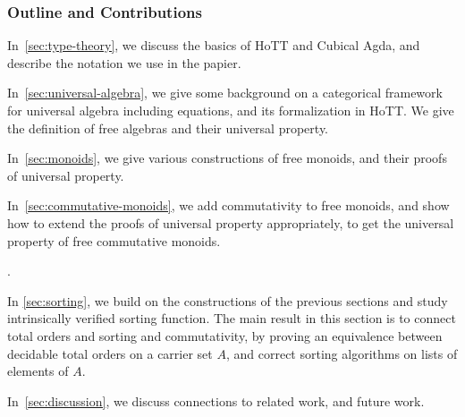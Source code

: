 


\subsubsection*{Outline and Contributions}

\begin{myitemize}
    \item In~\cref{sec:type-theory}, we discuss the basics of HoTT and Cubical Agda, and describe the notation we use in the papier.
    \item In~\cref{sec:universal-algebra}, we give some background on a categorical framework for universal algebra including equations, and its formalization in HoTT. We give the definition of free algebras and their universal property. 
    \item In~\cref{sec:monoids}, we give various constructions of free monoids, and their proofs of universal property.
    \item In~\cref{sec:commutative-monoids}, we add commutativity to free monoids, and show how to extend the proofs of universal property appropriately, to get the universal property of free commutative monoids.
    \item {}.
    \item In \cref{sec:sorting}, we build on the constructions of the previous sections and study intrinsically verified sorting function. The main result in this section is to connect total orders and sorting and commutativity, by proving an equivalence between decidable total orders on a carrier set $A$, and correct sorting algorithms on lists of elements of $A$.
    \item In~\cref{sec:discussion}, we discuss connections to related work, and future work.
\end{myitemize}
